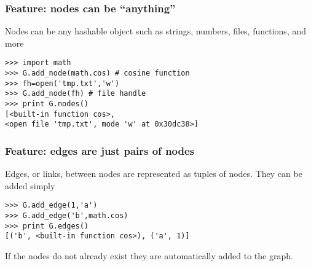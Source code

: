 \documentclass[xcolor=dvipsnames, 9pt]{beamer}
\begin{document}
\begin{frame}[fragile]
\frametitle{Feature: nodes can be ``anything''}

Nodes can be any hashable object such as strings,
numbers, files, functions, and more
\begin{block}{}
\begin{verbatim}
>>> import math
>>> G.add_node(math.cos) # cosine function
>>> fh=open('tmp.txt','w') 
>>> G.add_node(fh) # file handle
>>> print G.nodes()
[<built-in function cos>, 
<open file 'tmp.txt', mode 'w' at 0x30dc38>]
\end{verbatim}
\end{block}


\end{frame}



\begin{frame}[fragile]
\frametitle{Feature: edges are just pairs of nodes}
Edges, or links, between nodes are represented as tuples of nodes.  
They can be added simply
\begin{block}{}
\begin{verbatim}
>>> G.add_edge(1,'a')
>>> G.add_edge('b',math.cos)
>>> print G.edges()
[('b', <built-in function cos>), ('a', 1)]
\end{verbatim}
\end{block}

If the nodes do not already exist they are automatically added to the graph.



\end{frame}
\end{document}
